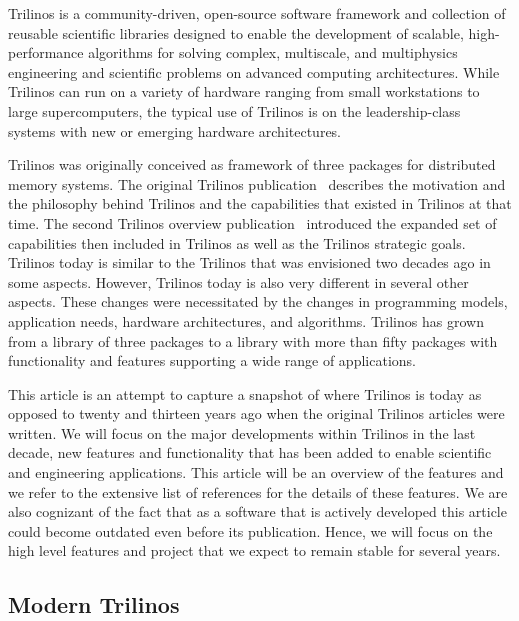 
Trilinos is a community-driven, open-source software framework and collection of reusable scientific libraries designed to enable the development of scalable, high-performance algorithms for solving complex, multiscale, and multiphysics engineering and scientific problems on advanced computing architectures.
While Trilinos can run on a variety of hardware ranging from small workstations to large supercomputers, the typical use of Trilinos is on the leadership-class systems with new or emerging hardware architectures.

Trilinos was originally conceived as framework of three packages for distributed memory systems. The original Trilinos publication~\cite{Heroux2005a} describes the motivation and the philosophy behind Trilinos and the capabilities that existed in Trilinos at that time. The second Trilinos overview publication~\cite{Heroux2012} introduced the expanded set of capabilities then included in Trilinos as well as the Trilinos strategic goals. Trilinos today is similar to the Trilinos that was envisioned two decades ago in some aspects. However, Trilinos today is also very different in several other aspects. These changes were necessitated by the changes in programming models, application needs, hardware architectures, and algorithms. Trilinos has grown from a library of three packages to a library with more than fifty packages with functionality and features supporting a wide range of applications.

This article is an attempt to capture a snapshot of where Trilinos is today as opposed to twenty and thirteen years ago when the original Trilinos articles were written. We will focus on the major developments within Trilinos in the last decade, new features and functionality that has been added to enable scientific and engineering applications. This article will be an overview of the features and we refer to the extensive list of references for the details of these features. We are also cognizant of the fact that as a software that is actively developed this article could become outdated even before its publication. Hence, we will focus on the high level features and project that we expect to remain stable for several years.



\subsection{Modern Trilinos}

